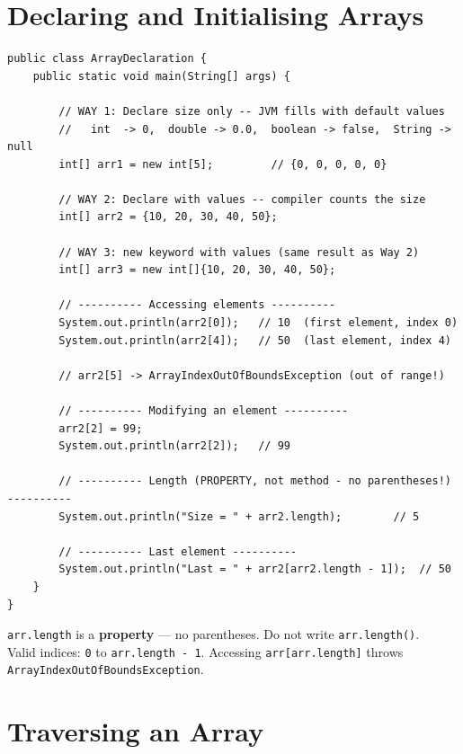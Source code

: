\documentclass[12pt,a4paper,oneside]{book}
\begin{document}
\section{Declaring and Initialising Arrays}

\begin{lstlisting}[caption={All ways to declare and initialise arrays in Java}]
public class ArrayDeclaration {
    public static void main(String[] args) {

        // WAY 1: Declare size only -- JVM fills with default values
        //   int  -> 0,  double -> 0.0,  boolean -> false,  String -> null
        int[] arr1 = new int[5];         // {0, 0, 0, 0, 0}

        // WAY 2: Declare with values -- compiler counts the size
        int[] arr2 = {10, 20, 30, 40, 50};

        // WAY 3: new keyword with values (same result as Way 2)
        int[] arr3 = new int[]{10, 20, 30, 40, 50};

        // ---------- Accessing elements ----------
        System.out.println(arr2[0]);   // 10  (first element, index 0)
        System.out.println(arr2[4]);   // 50  (last element, index 4)

        // arr2[5] -> ArrayIndexOutOfBoundsException (out of range!)

        // ---------- Modifying an element ----------
        arr2[2] = 99;
        System.out.println(arr2[2]);   // 99

        // ---------- Length (PROPERTY, not method - no parentheses!) ----------
        System.out.println("Size = " + arr2.length);        // 5

        // ---------- Last element ----------
        System.out.println("Last = " + arr2[arr2.length - 1]);  // 50
    }
}
\end{lstlisting}

\begin{warningbox}
\texttt{arr.length} is a \textbf{property} --- no parentheses. Do not write \texttt{arr.length()}.\\
Valid indices: \texttt{0} to \texttt{arr.length - 1}. Accessing \texttt{arr[arr.length]} throws \texttt{ArrayIndexOutOfBoundsException}.
\end{warningbox}

\section{Traversing an Array}
\end{document}
